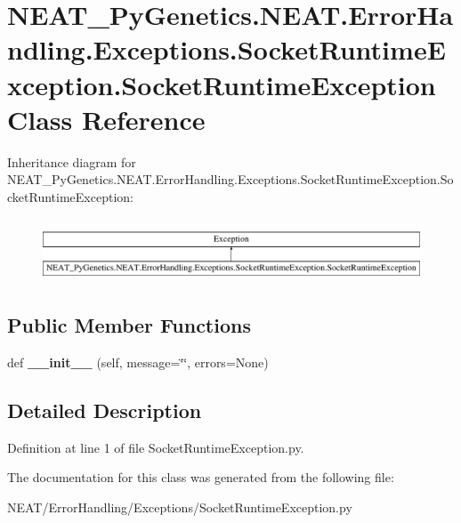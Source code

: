 \hypertarget{class_n_e_a_t___py_genetics_1_1_n_e_a_t_1_1_error_handling_1_1_exceptions_1_1_socket_runtime_exc1cc17ff15ee3bc97d249f00c72f41b97}{}\section{N\+E\+A\+T\+\_\+\+Py\+Genetics.\+N\+E\+A\+T.\+Error\+Handling.\+Exceptions.\+Socket\+Runtime\+Exception.\+Socket\+Runtime\+Exception Class Reference}
\label{class_n_e_a_t___py_genetics_1_1_n_e_a_t_1_1_error_handling_1_1_exceptions_1_1_socket_runtime_exc1cc17ff15ee3bc97d249f00c72f41b97}
Inheritance diagram for N\+E\+A\+T\+\_\+\+Py\+Genetics.\+N\+E\+A\+T.\+Error\+Handling.\+Exceptions.\+Socket\+Runtime\+Exception.\+Socket\+Runtime\+Exception\+:\begin{figure}[H]
\begin{center}
\leavevmode
\includegraphics[height=1.891892cm]{class_n_e_a_t___py_genetics_1_1_n_e_a_t_1_1_error_handling_1_1_exceptions_1_1_socket_runtime_exc1cc17ff15ee3bc97d249f00c72f41b97}
\end{center}
\end{figure}
\subsection*{Public Member Functions}
\begin{DoxyCompactItemize}
\item 
def {\bfseries \+\_\+\+\_\+init\+\_\+\+\_\+} (self, message=\char`\"{}\char`\"{}, errors=None)\hypertarget{class_n_e_a_t___py_genetics_1_1_n_e_a_t_1_1_error_handling_1_1_exceptions_1_1_socket_runtime_exc1cc17ff15ee3bc97d249f00c72f41b97_a747071f76bd0ecd08342e4ac9d7a5e33}{}\label{class_n_e_a_t___py_genetics_1_1_n_e_a_t_1_1_error_handling_1_1_exceptions_1_1_socket_runtime_exc1cc17ff15ee3bc97d249f00c72f41b97_a747071f76bd0ecd08342e4ac9d7a5e33}

\end{DoxyCompactItemize}


\subsection{Detailed Description}


Definition at line 1 of file Socket\+Runtime\+Exception.\+py.



The documentation for this class was generated from the following file\+:\begin{DoxyCompactItemize}
\item 
N\+E\+A\+T/\+Error\+Handling/\+Exceptions/Socket\+Runtime\+Exception.\+py\end{DoxyCompactItemize}
